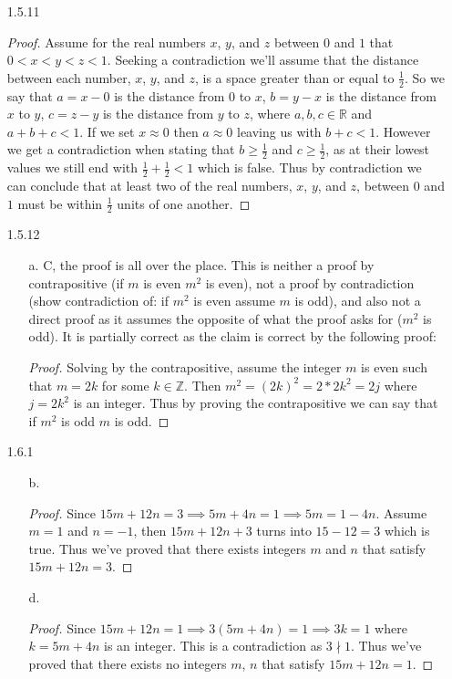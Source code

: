 \documentclass[11pt]{amsart}
\theoremstyle{definition}
\begin{document}
\begin{itemize}
\item[1.5.11] \begin{proof}
        Assume for the real numbers $x$, $y$, and $z$ between $0$ and $1$ that $0<x<y<z<1$. Seeking a contradiction we'll assume that the distance between each number, $x$, $y$, and $z$, is a space greater than or equal to $\frac 12$. So we say that $a=x-0$ is the distance from $0$ to $x$, $b=y-x$ is the distance from $x$ to $y$, $c=z-y$ is the distance from $y$ to $z$, where $a,b,c\in\mathbb{R}$ and $a+b+c<1$. If we set $x\approx 0$ then $a\approx 0$ leaving us with $b+c<1$. However we get a contradiction when stating that $b\ge \frac 12$ and $c\ge \frac 12$, as at their lowest values we still end with $\frac 12+\frac 12<1$ which is false. Thus by contradiction we can conclude that at least two of the real numbers, $x$, $y$, and $z$, between $0$ and $1$ must be within $\frac 12$ units of one another.
    \end{proof}

\item[1.5.12]
\begin{itemize}
    \item[a.] C, the proof is all over the place. This is neither a proof by contrapositive (if $m$ is even $m^2$ is even), not a proof by contradiction (show contradiction of: if $m^2$ is even assume $m$ is odd), and also not a direct proof as it assumes the opposite of what the proof asks for ($m^2$ is odd). It is partially correct as the claim is correct by the following proof:
    \begin{proof}
        Solving by the contrapositive, assume the integer $m$ is even such that $m=2k$ for some $k\in\mathbb{Z}$. Then $m^2=(2k)^2=2*2k^2=2j$ where $j=2k^2$ is an integer. Thus by proving the contrapositive we can say that if $m^2$ is odd $m$ is odd.
    \end{proof}
    
\end{itemize}

\item[1.6.1]
\begin{itemize}
    \item[b.] \begin{proof}
        Since $15m+12n=3\implies 5m+4n=1\implies 5m=1-4n$. Assume $m=1$ and $n=-1$, then $15m+12n+3$ turns into $15-12=3$ which is true. Thus we've proved that there exists integers $m$ and $n$ that satisfy $15m+12n=3$.
    \end{proof}

    \item[d.] \begin{proof}
        Since $15m+12n=1\implies 3(5m+4n)=1\implies 3k=1$ where $k=5m+4n$ is an integer. This is a contradiction as $3\nmid 1$. Thus we've proved that there exists no integers $m$, $n$ that satisfy $15m+12n=1$.
    \end{proof}


\end{itemize}
\end{itemize}
\end{document}
